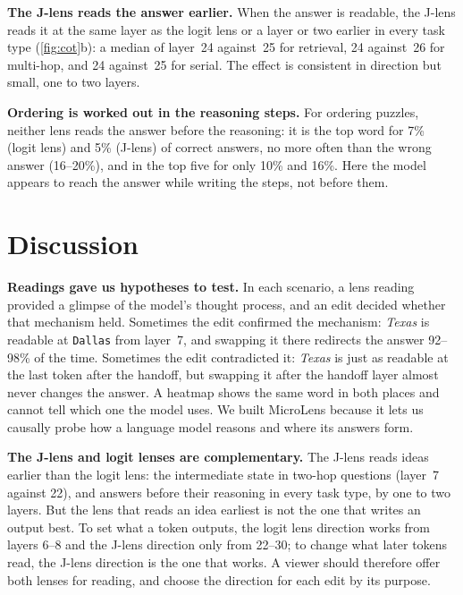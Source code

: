 \documentclass{vgtc}       %
\newcommand{\LL}{logit lens}
\newcommand{\JL}{J-lens}
\begin{document}
\textbf{The \JL{} reads the answer earlier.} When the answer is readable, the \JL{} reads it at the same layer as
the \LL{} or a layer or two earlier in every task type (\cref{fig:cot}b): a median of layer~24 against~25 for
retrieval, 24 against~26 for multi-hop, and 24 against~25 for serial. The effect is consistent in direction but
small, one to two layers.

\textbf{Ordering is worked out in the reasoning steps.} For ordering puzzles, neither lens reads the answer before the
reasoning: it is the top word for 7\% (\LL) and 5\% (\JL) of correct answers, no more often than the wrong answer
(16--20\%), and in the top five for only 10\% and 16\%. Here the model appears to reach the answer while writing the steps,
not before them.

\section{Discussion}
\label{sec:discussion}
\;
\textbf{Readings gave us hypotheses to test.}
In each scenario, a lens reading provided a glimpse of the model's
thought process, and an edit decided
whether that mechanism held. Sometimes the edit confirmed the mechanism: \emph{Texas} is readable at \texttt{Dallas} from layer~7, and
swapping it there redirects the answer 92--98\% of the time. Sometimes the edit contradicted it: \emph{Texas} is just
as readable at the last token after the handoff, but swapping it after the handoff layer almost never changes the answer.
A heatmap shows the same word in both places and cannot tell which one the model uses. We built MicroLens
because it lets us causally probe how a language model reasons and where its answers form.

\textbf{The \JL{} and \LL es are complementary.} The \JL{} reads ideas earlier than the \LL: the intermediate state in
two-hop questions (layer~7 against 22), and answers before their reasoning in every task type, by one to two layers. But the lens that reads an idea earliest is not the one that writes an output best. To set what
a token outputs, the \LL{} direction works from layers 6--8 and the \JL{} direction only from 22--30; to change what
later tokens read, the \JL{} direction is the one that works. A viewer should therefore offer both lenses for reading,
and choose the direction for each edit by its purpose.
\end{document}
